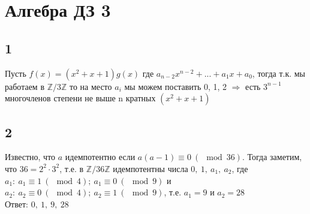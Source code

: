 \newpage
	\section{Алгебра ДЗ 3}
		\subsection{1}	
		Пусть $f(x) = (x^2 + x + 1) g(x)$ где $a_{n-2}x^{n-2} + ... + a_{1}x + a_{0}$, тогда т.к. мы работаем в $\mathbb{Z} / 3\mathbb{Z}$ то на место $a_i$ мы можем поставить 0, 1, 2 $\Longrightarrow$ есть $3^{n-1}$ многочленов степени не выше n кратных $(x^2 + x + 1)$
	
		\subsection{2}	 
		Известно, что $a$ идемпотентно если $a(a-1) \equiv 0 \: (\mod 36)$. Тогда заметим, что $36 = 2^2 \cdot 3^2$, т.е. в $\mathbb{Z} / 36\mathbb{Z}$ идемпотентны числа $0,\: 1,\: a_1,\: a_2$, где $a_1: \: a_1 \equiv 1 \: (\mod 4) ; \: a_1 \equiv 0 \: (\mod 9)$ и $a_2: \: a_2 \equiv 0 \: (\mod 4) ; \: a_2 \equiv 1 \: (\mod 9)$, т.е. $a_1 = 9$ и $a_2 = 28$\\
		Ответ: $0,\: 1,\: 9,\: 28$
		
